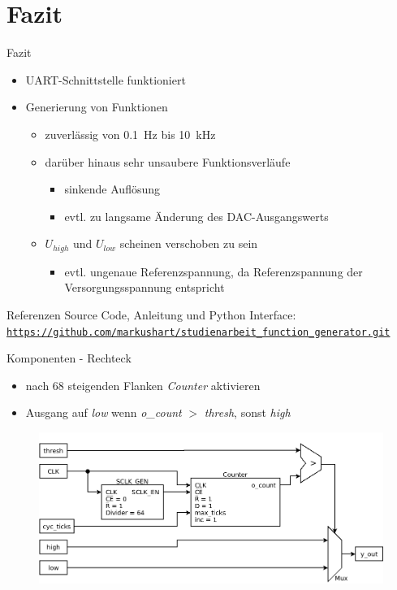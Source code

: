 \documentclass[11pt]{beamer}
\begin{document}
\section{Fazit}
\begin{frame}{Fazit}
  \begin{itemize}
  \item UART-Schnittstelle funktioniert
  \item Generierung von Funktionen
    \begin{itemize}
      \item zuverlässig von \SI{0.1}{\hertz} bis \SI{10}{\kilo\hertz}
      \item darüber hinaus sehr unsaubere Funktionsverläufe
        \begin{itemize}
        \item sinkende Auflösung
        \item evtl. zu langsame Änderung des DAC-Ausgangswerts
        \end{itemize}
      \item $U_{high}$ und $U_{low}$ scheinen verschoben zu sein
      \begin{itemize}
        \item evtl. ungenaue Referenzspannung, da Referenzspannung der Versorgungsspannung entspricht
      \end{itemize}
      \end{itemize}
  \end{itemize}
\end{frame}

\begin{frame}{Referenzen}
  Source Code, Anleitung und Python Interface:\\ 
  \href{https://github.com/markushart/studienarbeit_function_generator.git}{\small\texttt{https://github.com/markushart/studienarbeit\_function\_generator.git}}
\end{frame}

\begin{frame}{Komponenten - Rechteck}
  \begin{itemize}
  \item nach 68 steigenden Flanken \emph{Counter} aktivieren
  \item Ausgang auf \emph{low} wenn \emph{o\_count} $>$ \emph{thresh}, sonst \emph{high} 
  \end{itemize}
  \begin{figure}
    \includegraphics[scale=0.32]{square}
  \end{figure}
\end{frame}
\end{document}
